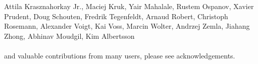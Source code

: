 \begin{center}
{Attila Krasznahorkay Jr., %
Maciej Kruk, %
Yair Mahalale, %
Rustem Ospanov, %
Xavier Prudent, %
Doug Schouten, %
Fredrik Tegenfeldt, %
Arnaud Robert, %
Christoph Rosemann, %
Alexander Voigt, %
Kai Voss, %
Marcin Wolter, %
Andrzej Zemla, %
Jiahang Zhong, %
Abhinav Moudgil, %
Kim Albertsson %
\\
\hspace{0.5cm} \\
and valuable contributions from many users, please see acknowledgements.
}
\end{center}

\thispagestyle{empty}
\newpage

